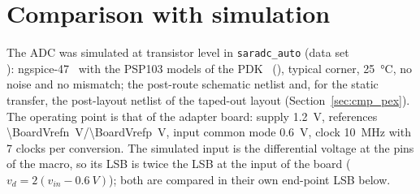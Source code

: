 
\section{Comparison with simulation}
\label{sec:comparison}
The ADC was simulated at transistor level in \texttt{saradc\_auto} (data set\\
\texttt{\SimSource}):
ngspice-47~\cite{ngspice} with the PSP103 models of the PDK~\cite{ihppdk} (\SimPdk), typical corner,
\SI{25}{\celsius}, no noise and no mismatch; the post-route schematic netlist\ifdefined\PexBitEA{} and, for the
static transfer, the post-layout netlist of the taped-out layout (Section~\ref{sec:cmp_pex})\fi.
The operating point is that of the adapter board: supply \SI{1.2}{V}, references
\SI{\BoardVrefn}{V}/\SI{\BoardVrefp}{V}, input common mode \SI{0.6}{V}, clock \SI{10}{MHz} with 7
clocks per conversion. The simulated input is the differential voltage at the pins of the macro, so its
LSB is twice the LSB at the input of the board ($v_d = 2(v_{in} - \SI{0.6}{V})$); both are compared in
their own end-point LSB below.

